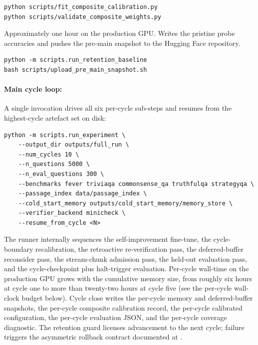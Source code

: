 \begin{description}[style=nextline,leftmargin=0pt]
\begin{verbatim}
python scripts/fit_composite_calibration.py
python scripts/validate_composite_weights.py
\end{verbatim}
\item[Retention baseline freeze and snapshot upload.] Approximately one hour on the production GPU. Writes the pristine probe accuracies and pushes the pre-main snapshot to the Hugging Face repository.
\begin{verbatim}
python -m scripts.run_retention_baseline
bash scripts/upload_pre_main_snapshot.sh
\end{verbatim}
\end{description}

\paragraph{Main cycle loop:} A single invocation drives all six per-cycle sub-steps and resumes from the highest-cycle artefact set on disk:
\begin{verbatim}
python -m scripts.run_experiment \
    --output_dir outputs/full_run \
    --num_cycles 10 \
    --n_questions 5000 \
    --n_eval_questions 300 \
    --benchmarks fever triviaqa commonsense_qa truthfulqa strategyqa \
    --passage_index data/passage_index \
    --cold_start_memory outputs/cold_start_memory/memory_store \
    --verifier_backend minicheck \
    --resume_from_cycle <N>
\end{verbatim}
The runner internally sequences the self-improvement fine-tune, the cycle-boundary recalibration, the retroactive re-verification pass, the deferred-buffer reconsider pass, the stream-chunk admission pass, the held-out evaluation pass, and the cycle-checkpoint plus halt-trigger evaluation. Per-cycle wall-time on the production GPU grows with the cumulative memory size, from roughly six hours at cycle one to more than twenty-two hours at cycle five (see the per-cycle wall-clock budget below). Cycle close writes the per-cycle memory and deferred-buffer snapshots, the per-cycle composite calibration record, the per-cycle calibrated configuration, the per-cycle evaluation JSON, and the per-cycle coverage diagnostic. The retention guard licenses advancement to the next cycle; failure triggers the asymmetric rollback contract documented at .

